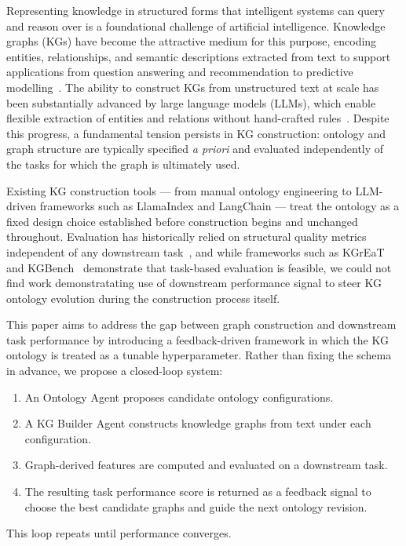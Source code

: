 Representing knowledge in structured forms that intelligent systems can query and reason
over is a foundational challenge of artificial intelligence. Knowledge graphs (KGs) have
become the attractive medium for this purpose, encoding entities, relationships, and semantic
descriptions extracted from text to support applications from question answering and
recommendation to predictive modelling~\citep{ji2021kgcompletion}. The ability to
construct KGs from unstructured text at scale has been substantially advanced by large
language models (LLMs), which enable flexible extraction of entities and relations without
hand-crafted rules~\citep{mo2025kggen}. Despite this progress, a fundamental tension
persists in KG construction: ontology and graph structure are typically specified
\emph{a priori} and evaluated independently of the tasks for which the graph is
ultimately used.

Existing KG construction tools --- from manual ontology engineering to LLM-driven
frameworks such as LlamaIndex and LangChain --- treat the ontology as a fixed design
choice established before construction begins and unchanged throughout.
Evaluation has historically relied on structural quality metrics independent of any
downstream task~\citep{paulheim2017kgquality}, and while frameworks such as
KGrEaT~\citep{heist2023kgreat} and KGBench~\citep{bloem2021kgbench} demonstrate that
task-based evaluation is feasible, we could not find work
demonstratating use of downstream performance signal to steer KG ontology evolution during the
construction process itself.

This paper aims to address the gap between graph construction and downstream task
performance by introducing a feedback-driven framework in which the KG
ontology is treated as a tunable hyperparameter. Rather than fixing the schema in
advance, we propose a closed-loop system:
\begin{enumerate}
    \item[\textit{(i)}] An Ontology Agent proposes candidate ontology configurations.
    \item[\textit{(ii)}] A KG Builder Agent constructs knowledge graphs from text under each configuration.
    \item[\textit{(iii)}] Graph-derived features are computed and evaluated on a downstream task.
    \item[\textit{(iv)}] The resulting task performance score is returned as a feedback signal to choose the best candidate graphs and guide the next ontology revision.
\end{enumerate}
This loop repeats until performance converges.

